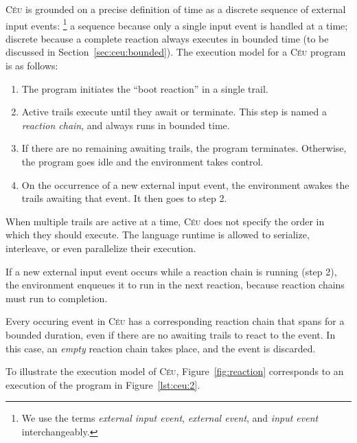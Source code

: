 \documentclass{sigplan-proc}
\newcommand{\2}{\;\;}
\newcommand{\5}{\;\;\;\;\;}
\newcommand{\CEU}{\textsc{C\'{e}u}}
\begin{document}

\CEU{} is grounded on a precise definition of time as a discrete sequence of 
external input events:%
\footnote{We use the terms \emph{external input event}, \emph{external event}, 
and \emph{input event} interchangeably.}
a sequence because only a single input event is handled at a time; discrete 
because a complete reaction always executes in bounded time (to be discussed in 
Section~\ref{sec:ceu:bounded}).
The execution model for a \CEU{} program is as follows:

\begin{enumerate}
\setlength{\itemsep}{0pt}
\item The program initiates the ``boot reaction'' in a single trail.
\item Active trails execute until they await or terminate.
      This step is named a \emph{reaction chain}, and always runs in bounded 
      time.
\item If there are no remaining awaiting trails, the program terminates.
      Otherwise, the program goes idle and the environment takes control.
\item On the occurrence of a new external input event, the environment awakes 
      the trails awaiting that event.
      It then goes to step 2.
\end{enumerate}

When multiple trails are active at a time, \CEU{} does not specify the order in 
which they should execute.
The language runtime is allowed to serialize, interleave, or even parallelize 
their execution.

If a new external input event occurs while a reaction chain is running (step 
2), the environment enqueues it to run in the next reaction, because reaction 
chains must run to completion.

Every occuring event in \CEU{} has a corresponding reaction chain that spans 
for a bounded duration, even if there are no awaiting trails to react to the 
event.
In this case, an \emph{empty} reaction chain takes place, and the event is 
discarded.

To illustrate the execution model of \CEU{}, Figure~\ref{fig:reaction} 
corresponds to an execution of the program in Figure~\ref{lst:ceu:2}.
\end{document}
